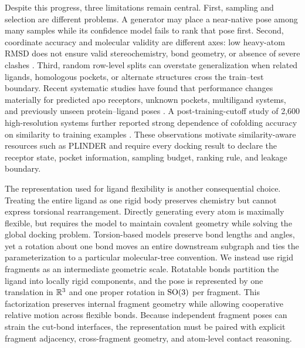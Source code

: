 Despite this progress, three limitations remain central. First, sampling and
selection are different problems. A generator may place a near-native pose
among many samples while its confidence model fails to rank that pose first.
Second, coordinate accuracy and molecular validity are different axes:
low heavy-atom RMSD does not ensure valid stereochemistry, bond geometry, or
absence of severe clashes \citep{buttenschoen2024posebusters}. Third, random
row-level splits can overstate generalization when related ligands, homologous
pockets, or alternate structures cross the train--test boundary. Recent
systematic studies have found that performance changes materially for predicted
apo receptors, unknown pockets, multiligand systems, and previously unseen
protein--ligand poses \citep{morehead2026posebench}. A post-training-cutoff
study of 2,600 high-resolution systems further reported strong dependence of
cofolding accuracy on similarity to training examples
\citep{skrinjar2026generalization}. These observations motivate
similarity-aware resources such as PLINDER \citep{durairaj2024plinder} and
require every docking result to declare the receptor state, pocket
information, sampling budget, ranking rule, and leakage boundary.

The representation used for ligand flexibility is another consequential
choice. Treating the entire ligand as one rigid body preserves chemistry but
cannot express torsional rearrangement. Directly generating every atom is
maximally flexible, but requires the model to maintain covalent geometry while
solving the global docking problem. Torsion-based models preserve bond lengths
and angles, yet a rotation about one bond moves an entire downstream subgraph
and ties the parameterization to a particular molecular-tree convention. We
instead use rigid fragments as an intermediate geometric scale. Rotatable bonds
partition the ligand into locally rigid components, and the pose is represented
by one translation in \(\mathbb{R}^3\) and one proper rotation in \(\mathrm{SO}(3)\) per
fragment. This factorization preserves internal fragment geometry while
allowing cooperative relative motion across flexible bonds. Because independent
fragment poses can strain the cut-bond interfaces, the representation must be
paired with explicit fragment adjacency, cross-fragment geometry, and
atom-level contact reasoning.


